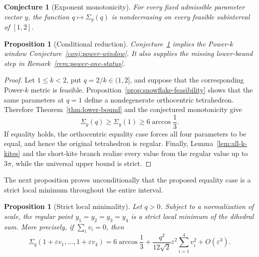 \documentclass[11pt,a4paper]{article}
\newtheorem{proposition}[theorem]{Proposition}
\newtheorem{conjecture}[theorem]{Conjecture}
\theoremstyle{definition}
\theoremstyle{remark}
\begin{document}
\begin{conjecture}[Exponent monotonicity]\label{conj:q-monotonicity}
For every fixed admissible parameter vector $y$, the function
$q\mapsto\Sigma_y(q)$ is nondecreasing on every feasible subinterval of
$[1,2]$.
\end{conjecture}

\begin{proposition}[Conditional reduction]\label{prop:conditional-window}
Conjecture~\ref{conj:q-monotonicity} implies the Power-$k$ window
Conjecture~\ref{conj:power-window}.  It also supplies the missing lower-bound
step in Remark~\ref{rem:power-one-status}.
\end{proposition}

\begin{proof}
Let $1\le k<2$, put $q=2/k\in(1,2]$, and suppose that the corresponding
Power-$k$ metric is feasible.  Proposition~\ref{prop:snowflake-feasibility}
shows that the same parameters at $q=1$ define a nondegenerate
orthocentric tetrahedron.  Therefore Theorem~\ref{thm:lower-bound} and the
conjectured monotonicity give
\[
 \Sigma_y(q)\ge\Sigma_y(1)\ge6\arccos\frac13.
\]
If equality holds, the orthocentric equality case forces all four parameters
to be equal, and hence the original tetrahedron is regular.  Finally,
Lemma~\ref{lem:all-k-kites} and the short-kite branch realize every value
from the regular value up to $3\pi$, while the universal upper bound is
strict.
\end{proof}

The next proposition proves unconditionally that the proposed equality case
is a strict local minimum throughout the entire interval.

\begin{proposition}[Strict local minimality]\label{prop:k-local-min}
Let $q>0$.  Subject to a normalization of scale, the regular point
$y_1=y_2=y_3=y_4$ is a strict local minimum of the dihedral sum.  More
precisely, if $\sum_i v_i=0$, then
\begin{equation}\label{eq:regular-expansion}
 \Sigma_q(1+\varepsilon v_1,\ldots,1+\varepsilon v_4)
 =6\arccos\frac13
 +\frac{q^2}{12\sqrt2}\varepsilon^2\sum_{i=1}^4v_i^2
 +O(\varepsilon^3).
\end{equation}
\end{proposition}
\end{document}
